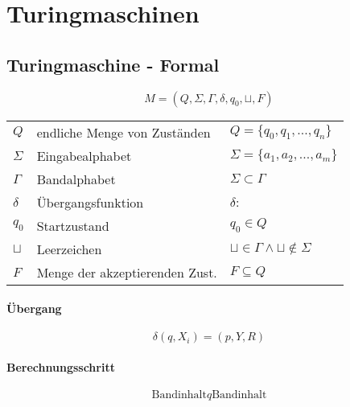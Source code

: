 
\section{Turingmaschinen}
%
%
%
%
%
%
%

\subsection{Turingmaschine - Formal}
\[
M=(Q,\Sigma,\Gamma,\delta,q_0,\sqcup,F)
\]
\begin{tabular}{lll}
	\(Q\)		& endliche Menge von Zuständen		& \(Q=\{q_0,q_1,...,q_n\}\)\\
	\(\Sigma\)	& Eingabealphabet					& \(\Sigma = \{a_1,a_2,...,a_m\}\)\\
	\(\Gamma\)	& Bandalphabet						& \(\Sigma \subset \Gamma\)\\
	\(\delta\)	& Übergangsfunktion					& \(\delta:\)\\
	\(q_0\)		& Startzustand						& \(q_0 \in Q\)\\
	\(\sqcup\)	& Leerzeichen						& \(\sqcup \in \Gamma \land \sqcup \notin \Sigma\)\\
	\(F\)		& Menge der akzeptierenden Zust.	& \(F \subseteq Q\)\\
\end{tabular}

\paragraph{Übergang}
\[
\delta(q,X_i)=(p,Y,R)
\]

\paragraph{Berechnungsschritt}
\[
\text{Bandinhalt}q\text{Bandinhalt}
\]